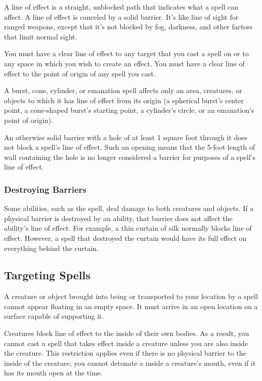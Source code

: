         A line of effect is a straight, unblocked path that indicates what a spell can affect.
        A line of effect is canceled by a solid barrier.
        It's like line of sight for ranged weapons, except that it's not blocked by fog, darkness, and other factors that limit normal sight.

        You must have a clear line of effect to any target that you cast a spell on or to any space in which you wish to create an effect.
        You must have a clear line of effect to the point of origin of any spell you cast.

        A burst, cone, cylinder, or emanation spell affects only an area, creatures, or objects to which it has line of effect from its origin (a spherical burst's center point, a cone-shaped burst's starting point, a cylinder's circle, or an emanation's point of origin).

        An otherwise solid barrier with a hole of at least 1 square foot through it does not block a spell's line of effect.
        Such an opening means that the 5-foot length of wall containing the hole is no longer considered a barrier for purposes of a spell's line of effect.

        \subsubsection{Destroying Barriers}\label{Destroying Barriers}
            Some abilities, such as the  spell, deal damage to both creatures and objects.
            If a physical barrier is destroyed by an ability, that barrier does not affect the ability's line of effect.
            For example, a thin curtain of silk normally blocks line of effect.
            However, a spell that destroyed the curtain would have its full effect on everything behind the curtain.

    \subsection{Targeting Spells}

         A creature or object brought into being or transported to your location by a spell cannot appear floating in an empty space.
        It must arrive in an open location on a surface capable of supporting it.

         Creatures block line of effect to the inside of their own bodies.
        As a result, you cannot cast a spell that takes effect inside a creature unless you are also inside the creature.
        This restriction applies even if there is no physical barrier to the inside of the creature; you cannot detonate a  inside a creature's mouth, even if it has its mouth open at the time.

